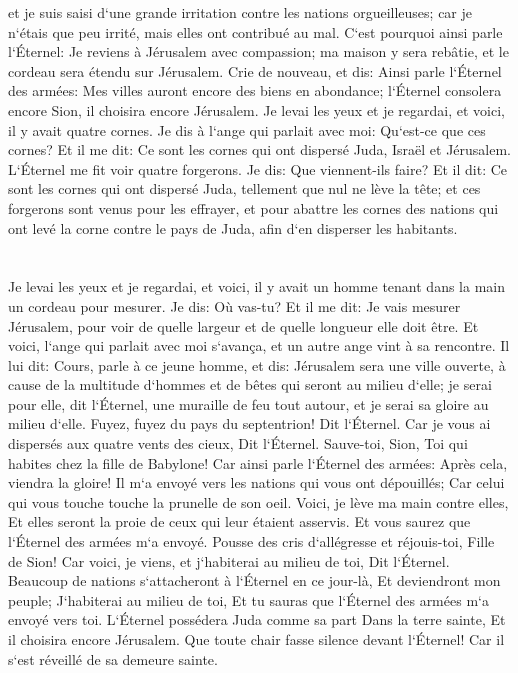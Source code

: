 \verse et je suis saisi d`une grande irritation contre les nations orgueilleuses; car je n`étais que peu irrité, mais elles ont contribué au mal. 
\verse C`est pourquoi ainsi parle l`Éternel: Je reviens à Jérusalem avec compassion; ma maison y sera rebâtie, et le cordeau sera étendu sur Jérusalem. 
\verse Crie de nouveau, et dis: Ainsi parle l`Éternel des armées: Mes villes auront encore des biens en abondance; l`Éternel consolera encore Sion, il choisira encore Jérusalem. 
\verse Je levai les yeux et je regardai, et voici, il y avait quatre cornes. 
\verse Je dis à l`ange qui parlait avec moi: Qu`est-ce que ces cornes? Et il me dit: Ce sont les cornes qui ont dispersé Juda, Israël et Jérusalem. 
\verse L`Éternel me fit voir quatre forgerons. 
\verse Je dis: Que viennent-ils faire? Et il dit: Ce sont les cornes qui ont dispersé Juda, tellement que nul ne lève la tête; et ces forgerons sont venus pour les effrayer, et pour abattre les cornes des nations qui ont levé la corne contre le pays de Juda, afin d`en disperser les habitants. 

\chapter{}

\verse Je levai les yeux et je regardai, et voici, il y avait un homme tenant dans la main un cordeau pour mesurer. 
\verse Je dis: Où vas-tu? Et il me dit: Je vais mesurer Jérusalem, pour voir de quelle largeur et de quelle longueur elle doit être. 
\verse Et voici, l`ange qui parlait avec moi s`avança, et un autre ange vint à sa rencontre. 
\verse Il lui dit: Cours, parle à ce jeune homme, et dis: Jérusalem sera une ville ouverte, à cause de la multitude d`hommes et de bêtes qui seront au milieu d`elle; 
\verse je serai pour elle, dit l`Éternel, une muraille de feu tout autour, et je serai sa gloire au milieu d`elle. 
\verse Fuyez, fuyez du pays du septentrion! Dit l`Éternel. Car je vous ai dispersés aux quatre vents des cieux, Dit l`Éternel. 
\verse Sauve-toi, Sion, Toi qui habites chez la fille de Babylone! 
\verse Car ainsi parle l`Éternel des armées: Après cela, viendra la gloire! Il m`a envoyé vers les nations qui vous ont dépouillés; Car celui qui vous touche touche la prunelle de son oeil. 
\verse Voici, je lève ma main contre elles, Et elles seront la proie de ceux qui leur étaient asservis. Et vous saurez que l`Éternel des armées m`a envoyé. 
\verse Pousse des cris d`allégresse et réjouis-toi, Fille de Sion! Car voici, je viens, et j`habiterai au milieu de toi, Dit l`Éternel. 
\verse Beaucoup de nations s`attacheront à l`Éternel en ce jour-là, Et deviendront mon peuple; J`habiterai au milieu de toi, Et tu sauras que l`Éternel des armées m`a envoyé vers toi. 
\verse L`Éternel possédera Juda comme sa part Dans la terre sainte, Et il choisira encore Jérusalem. 
\verse Que toute chair fasse silence devant l`Éternel! Car il s`est réveillé de sa demeure sainte. 

